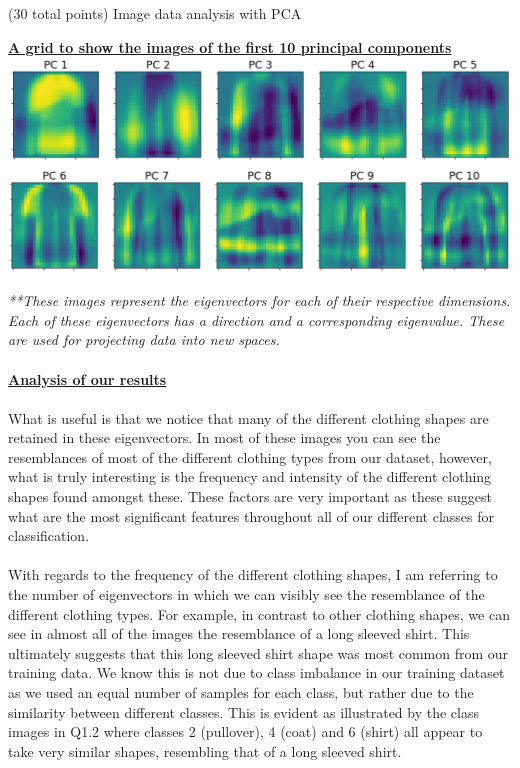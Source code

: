\documentclass[12pt]{article}
\begin{document}
\begin{question}{(30 total points) Image data analysis with PCA}
\begin{subquestion}
      \begin{answerbox}{49em}
        \begin{center}
        \textbf{\underline{A grid to show the images of the first 10 principal components}}
        \vspace{0.3cm}\\
         \includegraphics[width=1\textwidth]{images/q151.png}
         \includegraphics[width=1\textwidth]{images/q152.png}
        \end{center}
        \footnotesize{
        \emph{**These images represent the eigenvectors for each of their respective dimensions. Each of these eigenvectors has a direction and a corresponding eigenvalue. These are used for projecting data into new spaces.}\\
\\
        \textbf{\underline{Analysis of our results}}\\
\\
        What is useful is that we notice that many of the different clothing shapes are retained in these eigenvectors. In most of these images you can see the resemblances of most of the different clothing types from our dataset, however, what is truly interesting is the frequency and intensity of the different clothing shapes found amongst these. These factors are very important as these suggest what are the most significant features throughout all of our different classes for classification.\\
\\
        With regards to the frequency of the different clothing shapes, I am referring to the number of eigenvectors in which we can visibly see the resemblance of the different clothing types. For example, in contrast to other clothing shapes, we can see in almost all of the images the resemblance of a long sleeved shirt. This ultimately suggests that this long sleeved shirt shape was most common from our training data. We know this is not due to class imbalance in our training dataset as we used an equal number of samples for each class, but rather due to the similarity between different classes. This is evident as illustrated by the class images in Q1.2 where classes 2 (pullover), 4 (coat) and 6 (shirt) all appear to take very similar shapes, resembling that of a long sleeved shirt.\\
}
\end{answerbox}
\end{subquestion}
\end{question}
\end{document}
